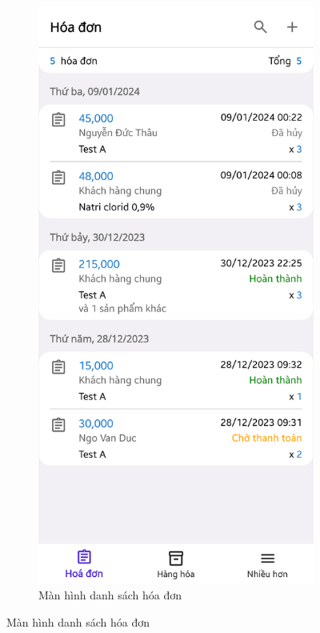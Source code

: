 \documentclass[../DoAn.tex]{subfiles}
\begin{document}
\begin{figure}[H]
    \begin{subfigure}{0.49\linewidth}
        \centering
        \includegraphics[width=0.9\linewidth]{Hinhve/design/screens/InvoiceListPage}
        \caption{Màn hình danh sách hóa đơn}
        \label{figure:screen-invoicelistpage}
    \end{subfigure}

\end{figure}
\end{document}

